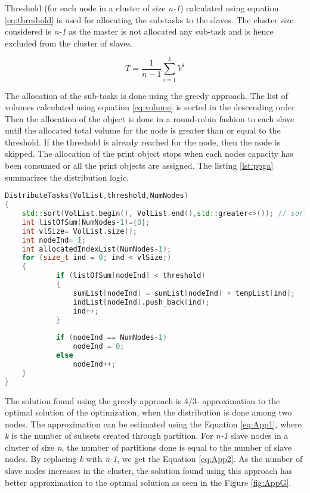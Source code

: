 Threshold (for each node in a cluster of size \textit{n-1}) calculated using equation \ref{eq:threshold} is used for allocating the sub-tasks to the slaves. The cluster size considered is \textit{n-1} as the master is not allocated any sub-task and is hence excluded from the cluster of slaves.

\begin{equation}
\label{eq:threshold}
T =\frac{1}{n-1}\sum\limits_{i=1}^{k}{V^i}
\end{equation}

The allocation of the sub-tasks is done using the greedy approach. The list of volumes calculated using equation \ref{eq:volume} is sorted in the  descending order. Then the allocation of the object is done in a round-robin fashion to each slave  until the allocated total volume  for the node is greater than or equal to the threshold. If the threshold is already reached for the node, then the node is skipped. The allocation of the print object stops when each node\textquotesingle s capacity has been consumed or all the print objects are assigned. The listing \ref{lst:ppga} summarizes the distribution logic.

\begin{lstlisting}[language=C++,label={lst:ppga},caption={Distribute Tasks- Greedy Approach}]
DistributeTasks(VolList,threshold,NumNodes)
{
	std::sort(VolList.begin(), VolList.end(),std::greater<>()); // sort in descending order
	int listOfSum(NumNodes-1)={0};
	int vlSize= VolList.size();
	int nodeInd= 1;
	int allocatedIndexList(NumNodes-1);
	for (size_t ind = 0; ind < vlSize;)
	{
			if (listOfSum[nodeInd] < threshold)
			{
				sumList[nodeInd] = sumList[nodeInd] + tempList[ind];
				indList[nodeInd].push_back(ind);
				ind++;
			}
			
			if (nodeInd == NumNodes-1)
				nodeInd = 0;
			else 
				nodeInd++;
	}
}
\end{lstlisting}

The solution found using the greedy approach is 4/3- approximation to the optimal solution of the optimization, when the distribution is done among two nodes.  The approximation can be estimated using the Equation \ref{eq:App1}, where \textit{k} is the number of subsets created through partition\cite{app}. For \textit{n-1} slave nodes in a cluster of size \textit{n}, the number of partitions done is equal to the number of slave nodes. By replacing \textit{k} with \textit{n-1}, we get the Equation \ref{eq:App2}. As the number of slave nodes increases in the cluster, the solution found using this approach has better approximation to the optimal solution as seen in the Figure \ref{fig:AppG}.

